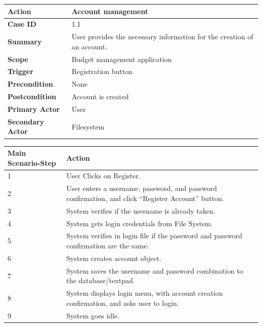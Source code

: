 \documentclass[letterpaper]{article}
\begin{document}
        \begin{center}
        	\begin{tabular}{ | m{3.5cm} | m{7.5cm}| } 
	            \hline
	            \textbf{Action} & Account management \\ 
	            \hline
	            \textbf{Case ID} & 1.1 \\ 
	            \hline
	            \textbf{Summary} & User provides the necessary information for the creation of an account. \\
	            \hline
	            \textbf{Scope} & Budget management application \\ 
	            \hline
	            \textbf{Trigger} & Registration button \\
	            \hline
	            \textbf{Precondition} & None \\ 
	            \hline
	            \textbf{Postcondition} & Account is created \\ 
	            \hline
	            \textbf{Primary Actor} & User \\ 
	            \hline
	            \textbf{Secondary Actor} & Filesystem \\ 
	            \hline
        	\end{tabular}
        
        	\vspace{2mm}
        
			\begin{tabular}{ | m{3.5cm} | m{7.5cm}| } 
				\hline
	            \textbf{Main Scenario-Step} & \textbf{Action} \\ 
	            \hline
	            1 & User Clicks on Register. \\ 
	            \hline
	            2 & User enters a username, password, and password confirmation, and click “Register Account” button. \\ 
	            \hline
	            3 & System verifies if the username is already taken. \\ 
	            \hline
	            4 & System gets login credentials from File System. \\ 
	            \hline
	            5 & System verifies in login file if the password and password confirmation are the same. \\ 
	            \hline
	            6 & System creates account object. \\ 
	            \hline
	            7 & System saves the username and password combination to the database/textpad. \\
	            \hline
	            8 & System displays login menu, with account creation confirmation, and asks user to login. \\ 
	            \hline
	            9 & System goes idle. \\ 
	            \hline
        	\end{tabular}
        \end{center}
        
\end{document}
